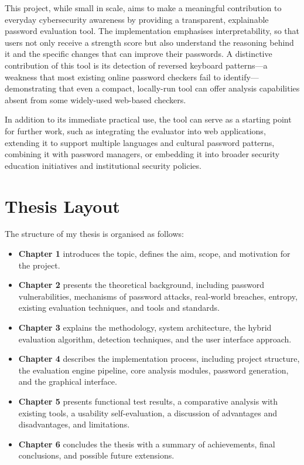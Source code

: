This project, while small in scale, aims to make a meaningful contribution to everyday cybersecurity awareness by providing a transparent, explainable password evaluation tool. The implementation emphasises interpretability, so that users not only receive a strength score but also understand the reasoning behind it and the specific changes that can improve their passwords. A distinctive contribution of this tool is its detection of reversed keyboard patterns---a weakness that most existing online password checkers fail to identify---demonstrating that even a compact, locally-run tool can offer analysis capabilities absent from some widely-used web-based checkers.

In addition to its immediate practical use, the tool can serve as a starting point for further work, such as integrating the evaluator into web applications, extending it to support multiple languages and cultural password patterns, combining it with password managers, or embedding it into broader security education initiatives and institutional security policies.

\clearpage

\section{Thesis Layout}

The structure of my thesis is organised as follows:
\begin{itemize}
    \item \textbf{Chapter 1} introduces the topic, defines the aim, scope, and motivation for the project.
    \item \textbf{Chapter 2} presents the theoretical background, including password vulnerabilities, mechanisms of password attacks, real-world breaches, entropy, existing evaluation techniques, and tools and standards.
    \item \textbf{Chapter 3} explains the methodology, system architecture, the hybrid evaluation algorithm, detection techniques, and the user interface approach.
    \item \textbf{Chapter 4} describes the implementation process, including project structure, the evaluation engine pipeline, core analysis modules, password generation, and the graphical interface.
    \item \textbf{Chapter 5} presents functional test results, a comparative analysis with existing tools, a usability self-evaluation, a discussion of advantages and disadvantages, and limitations.
    \item \textbf{Chapter 6} concludes the thesis with a summary of achievements, final conclusions, and possible future extensions.
\end{itemize}